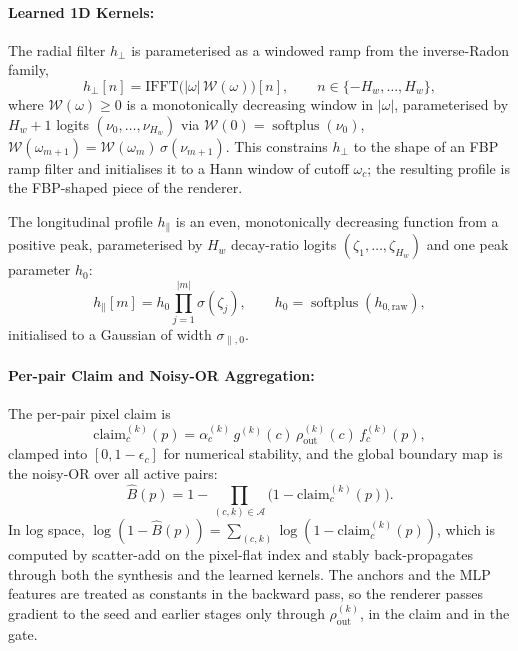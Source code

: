 \documentclass[11pt,a4paper]{article}
\newcommand{\abs}[1]{\left\lvert#1\right\rvert}
\newcommand{\softplus}{\operatorname{softplus}}
\begin{document}
\paragraph{Learned 1D Kernels:}
The radial filter $h_{\perp}$ is parameterised as a windowed ramp from the inverse-Radon family,
\begin{equation}\label{eq:h-perp}
  h_{\perp}[n] = \mathrm{IFFT}\bigl(\abs{\omega}\, \mathcal{W}(\omega)\bigr)[n],
  \qquad n \in \{-H_w, \dots, H_w\},
\end{equation}
where $\mathcal{W}(\omega) \geq 0$ is a monotonically decreasing window in $\abs{\omega}$, parameterised by $H_w + 1$ logits $(\nu_0, \dots, \nu_{H_w})$ via
$\mathcal{W}(0) = \softplus(\nu_0)$, $\mathcal{W}(\omega_{m+1}) = \mathcal{W}(\omega_m)\,\sigma(\nu_{m+1})$.
This constrains $h_{\perp}$ to the shape of an FBP ramp filter and initialises it to a Hann window of cutoff $\omega_c$; the resulting profile is the FBP-shaped piece of the renderer.

The longitudinal profile $h_{\parallel}$ is an even, monotonically decreasing function from a positive peak, parameterised by $H_w$ decay-ratio logits $(\zeta_1, \dots, \zeta_{H_w})$ and one peak parameter $h_0$:
\begin{equation}\label{eq:h-par}
  h_{\parallel}[m] = h_0 \prod_{j=1}^{\abs{m}} \sigma(\zeta_j),
  \qquad h_0 = \softplus(h_{0,\mathrm{raw}}),
\end{equation}
initialised to a Gaussian of width $\sigma_{\parallel,0}$.

\paragraph{Per-pair Claim and Noisy-OR Aggregation:}
The per-pair pixel claim is
\begin{equation}\label{eq:claim}
  \mathrm{claim}^{(k)}_c(p) = \alpha^{(k)}_c\, g^{(k)}(c)\, \rho_{\mathrm{out}}^{(k)}(c)\, f^{(k)}_c(p),
\end{equation}
clamped into $[0, 1-\epsilon_c]$ for numerical stability, and the global boundary map is the noisy-OR over all active pairs:
\begin{equation}\label{eq:noisy-or}
  \boxed{\;
  \hat B(p) = 1 - \prod_{(c, k)\in\mathcal{A}} \bigl(1 - \mathrm{claim}^{(k)}_c(p)\bigr).\;}
\end{equation}
In log space, $\log(1 - \hat B(p)) = \sum_{(c, k)} \log(1 - \mathrm{claim}^{(k)}_c(p))$, which is computed by scatter-add on the pixel-flat index and stably back-propagates through both the synthesis and the learned kernels. The anchors and the MLP features are treated as constants in the backward pass, so the renderer passes gradient to the seed and earlier stages only through $\rho_{\mathrm{out}}^{(k)}$, in the claim and in the gate.
\end{document}
